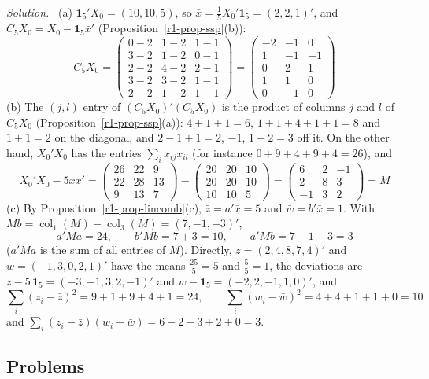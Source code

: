 \documentclass[12pt]{article}
\newcommand{\one}{\mathbf 1}
\DeclareMathOperator{\col}{col}
\theoremstyle{definition}
\newenvironment{solution}{\par\noindent\textit{Solution.}\ }{\par\smallskip}
\begin{document}
\begin{solution}
(a) \(\one_5'X_0=(10,10,5)\), so \(\bar x=\frac15X_0'\one_5=(2,2,1)'\), and \(C_5X_0=X_0-\one_5\bar x'\)
(Proposition~\ref{r1-prop-ssp}(b)):
\[
C_5X_0=\begin{pmatrix}0-2&1-2&1-1\\3-2&1-2&0-1\\2-2&4-2&2-1\\3-2&3-2&1-1\\2-2&1-2&1-1\end{pmatrix}
=\begin{pmatrix}-2&-1&0\\1&-1&-1\\0&2&1\\1&1&0\\0&-1&0\end{pmatrix}
\]
(b) The \((j,l)\) entry of \((C_5X_0)'(C_5X_0)\) is the product of columns \(j\) and \(l\) of \(C_5X_0\)
(Proposition~\ref{r1-prop-ssp}(a)): \(4+1+1=6\), \(1+1+4+1+1=8\) and \(1+1=2\) on the diagonal, and
\(2-1+1=2\), \(-1\), \(1+2=3\) off it. On the other hand, \(X_0'X_0\) has the entries
\(\sum_ix_{ij}x_{il}\) (for instance \(0+9+4+9+4=26\)), and
\[
X_0'X_0-5\bar x\bar x'=\begin{pmatrix}26&22&9\\22&28&13\\9&13&7\end{pmatrix}-\begin{pmatrix}20&20&10\\20&20&10\\10&10&5\end{pmatrix}
=\begin{pmatrix}6&2&-1\\2&8&3\\-1&3&2\end{pmatrix}=M
\]
(c) By Proposition~\ref{r1-prop-lincomb}(c), \(\bar z=a'\bar x=5\) and \(\bar w=b'\bar x=1\). With
\(Mb=\col_1(M)-\col_3(M)=(7,-1,-3)'\),
\[
a'Ma=24,\qquad b'Mb=7+3=10,\qquad a'Mb=7-1-3=3
\]
(\(a'Ma\) is the sum of all entries of \(M\)). Directly, \(z=(2,4,8,7,4)'\) and \(w=(-1,3,0,2,1)'\) have the means
\(\frac{25}5=5\) and \(\frac55=1\), the deviations are \(z-5\,\one_5=(-3,-1,3,2,-1)'\) and
\(w-\one_5=(-2,2,-1,1,0)'\), and
\[
\sum_i(z_i-\bar z)^2=9+1+9+4+1=24,\qquad \sum_i(w_i-\bar w)^2=4+4+1+1+0=10
\]
and \(\sum_i(z_i-\bar z)(w_i-\bar w)=6-2-3+2+0=3\).
\end{solution}

\subsection*{Problems}
\end{document}
